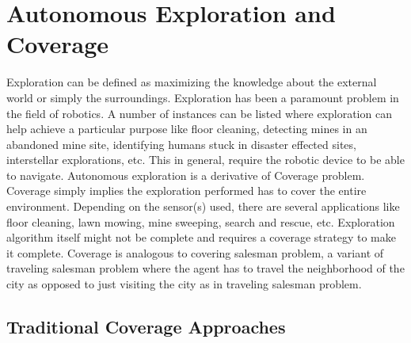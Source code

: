 \section{Autonomous Exploration and Coverage}
Exploration can be defined as maximizing the knowledge about the external world or simply the surroundings. Exploration has been a paramount problem in the field of robotics. A number of instances can be listed where exploration can help achieve a particular purpose like floor cleaning, detecting mines in an abandoned mine site, identifying humans stuck in disaster effected sites\cite{9}, interstellar explorations\cite{10}, etc. This in general, require the robotic device to be able to navigate. 
Autonomous exploration is a derivative of Coverage problem. Coverage simply implies the exploration performed has to cover the entire environment. Depending on the sensor(s) used, there are several applications like floor cleaning, lawn mowing, mine sweeping, search and rescue, etc. Exploration algorithm itself might not be complete and requires a coverage strategy to make it complete. Coverage is analogous to covering salesman problem, a variant of traveling salesman problem where the agent has to travel the neighborhood of the city as opposed to just visiting the city as in traveling salesman problem\cite{28}. 

\subsection{Traditional Coverage Approaches}

